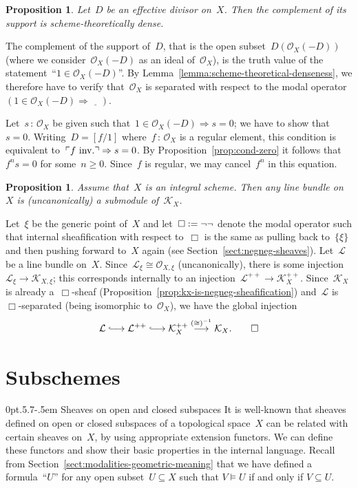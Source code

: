 \documentclass[10pt,reqno,a4paper]{amsbook}
\makeatletter
\theoremstyle{definition}
\theoremstyle{plain}
\newtheorem{prop}[defn]{Proposition}
\theoremstyle{remark}
\renewcommand{\O}{\mathcal{O}}
\newcommand{\K}{\mathcal{K}}
\renewcommand{\L}{\mathcal{L}}
\newcommand{\placeholder}{\underline{\quad}}
\newcommand{\?}{\,{:}\,}
\renewcommand{\_}{\mathpunct{.}\,}
\newcommand{\speak}[1]{\ulcorner\text{\textnormal{#1}}\urcorner}
\newcommand{\lhra}{\ensuremath{\lhook\joinrel\relbar\joinrel\rightarrow}}
\newcommand{\inv}{inv.\@}
\newcommand{\effective}{ef{}fective\xspace}
\newcommand{\defeq}{\vcentcolon=}
\renewenvironment{proof}[1][\proofname]{\par
  \pushQED{\qed}%
  \normalfont \topsep6\p@\@plus6\p@\relax
  \trivlist
  \item[\hskip\labelsep
        \itshape
    #1\@addpunct{.}]\ignorespaces
}{%
  \popQED\endtrivlist\@endpefalse
}
\def\subsection{\@startsection{subsection}{2}%
  {0pt}{.5\linespacing\@plus.7\linespacing}{-.5em}%
  {\normalfont\bfseries}}
\makeatother
\begin{document}
\begin{prop}Let~$D$ be an \effective divisor on~$X$. Then the complement of its
support is scheme-theoretically dense.\end{prop}
\begin{proof}The complement of the support of~$D$, that is the open
subset~$D(\O_X(-D))$ (where we consider~$\O_X(-D)$ as an ideal of~$\O_X$), is
the truth value of the statement~``$1 \in \O_X(-D)$''. By
Lemma~\ref{lemma:scheme-theoretical-denseness}, we therefore have to verify
that~$\O_X$ is separated with respect to the modal operator~$(1 \in \O_X(-D)
\Rightarrow \placeholder)$.

Let~$s \? \O_X$ be given such that~$1 \in \O_X(-D) \Rightarrow s = 0$; we have
to show that~$s = 0$. Writing~$D = [f/1]$ where~$f \? \O_X$ is a regular
element, this condition is equivalent to~$\speak{$f$ \inv} \Rightarrow s = 0$.
By Proposition~\ref{prop:cond-zero} it follows that~$f^n s = 0$ for some~$n
\geq 0$. Since~$f$ is regular, we may cancel~$f^n$ in this equation.
\end{proof}

\begin{prop}Assume that~$X$ is an integral scheme. Then any line bundle on~$X$
is (uncanonically) a submodule of~$\K_X$.\end{prop}
\begin{proof}Let~$\xi$ be the generic point of~$X$ and let~$\Box \defeq \neg\neg$
denote the modal operator such that internal sheafification with respect
to~$\Box$ is the same as pulling back to~$\{\xi\}$ and then pushing forward
to~$X$ again (see Section~\ref{sect:negneg-sheaves}). Let~$\L$ be a line bundle on~$X$. Since~$\L_\xi \cong
\O_{X,\xi}$ (uncanonically), there is some injection~$\L_\xi \to \K_{X,\xi}$;
this corresponds internally to an injection~$\L^{++} \to \K_X^{++}$.
Since~$\K_X$ is already a~$\Box$-sheaf
(Proposition~\ref{prop:kx-is-negneg-sheafification}) and~$\L$ is~$\Box$-separated
(being isomorphic to~$\O_X$), we have the global injection
\[ \L \lhra \L^{++} \lhra \K_X^{++} \stackrel{({\cong})^{-1}}{\longrightarrow} \K_X. \qedhere \]
\end{proof}


\section{Subschemes}

\subsection{Sheaves on open and closed subspaces} It is well-known that sheaves
defined on open or closed subspaces of a topological space~$X$ can be related
with certain sheaves on~$X$, by using appropriate extension functors. We can
define these functors and show their basic properties in the internal
language. Recall from Section~\ref{sect:modalities-geometric-meaning} that we
have defined a formula~``$U$'' for any open subset~$U \subseteq X$ such that
$V \models U$ if and only if $V \subseteq U$.
\end{document}
